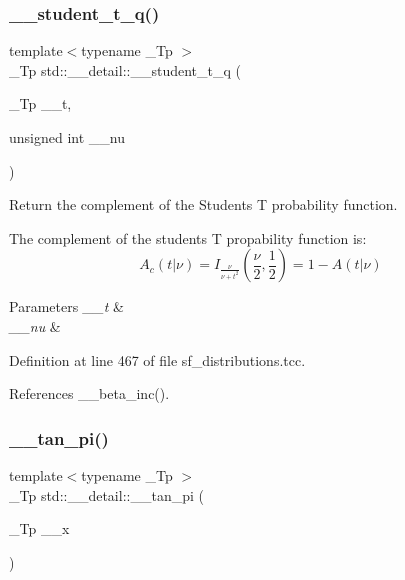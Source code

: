 \subsubsection{\texorpdfstring{\+\_\+\+\_\+student\+\_\+t\+\_\+q()}{\_\_student\_t\_q()}}
{\footnotesize\ttfamily template$<$typename \+\_\+\+Tp $>$ \\
\+\_\+\+Tp std\+::\+\_\+\+\_\+detail\+::\+\_\+\+\_\+student\+\_\+t\+\_\+q (\begin{DoxyParamCaption}\item[{\+\_\+\+Tp}]{\+\_\+\+\_\+t,  }\item[{unsigned int}]{\+\_\+\+\_\+nu }\end{DoxyParamCaption})}



Return the complement of the Students T probability function. 

The complement of the students T propability function is\+: \[ A_c(t|\nu) = I_{\frac{\nu}{\nu + t^2}}(\frac{\nu}{2}, \frac{1}{2}) = 1 - A(t|\nu) \]


\begin{DoxyParams}{Parameters}
{\em \+\_\+\+\_\+t} & \\
\hline
{\em \+\_\+\+\_\+nu} & \\
\hline
\end{DoxyParams}


Definition at line 467 of file sf\+\_\+distributions.\+tcc.



References \+\_\+\+\_\+beta\+\_\+inc().

\mbox{\label{namespacestd_1_1____detail_a72fd3b7fcf9f49ade9411d782e8dbe4e}} 
\subsubsection{\texorpdfstring{\+\_\+\+\_\+tan\+\_\+pi()}{\_\_tan\_pi()}\hspace{0.1cm}{\footnotesize\ttfamily [1/2]}}
{\footnotesize\ttfamily template$<$typename \+\_\+\+Tp $>$ \\
\+\_\+\+Tp std\+::\+\_\+\+\_\+detail\+::\+\_\+\+\_\+tan\+\_\+pi (\begin{DoxyParamCaption}\item[{\+\_\+\+Tp}]{\+\_\+\+\_\+x }\end{DoxyParamCaption})}

